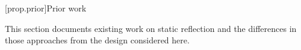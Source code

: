 [prop.prior]{Prior work}

This section documents existing work on static reflection and the differences in those approaches from the design considered here.
